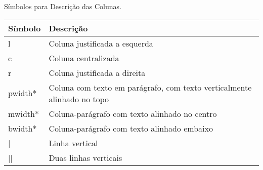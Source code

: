 \begin{quadro}[H]
    \centering
    \caption{Símbolos para Descrição das Colunas.\label{qua:quadro-colunas}}
    \begin{tabular}{|p{4cm}|p{10cm}|}
        \hline
        \textbf{Símbolo} & \textbf{Descrição} \\
        \hline
        l & Coluna justificada a esquerda \\
        \hline
        c & Coluna centralizada \\
        \hline
        r & Coluna justificada a direita \\
        \hline
        p{width*} & Coluna com texto em parágrafo, com texto verticalmente alinhado no topo \\
        \hline
        m{width*} & Coluna-parágrafo com texto alinhado no centro \\
        \hline
        b{width*} & Coluna-parágrafo com texto alinhado embaixo \\
        \hline
        | & Linha vertical \\
        \hline
        || & Duas linhas verticais \\
        \hline
    \end{tabular}
\end{quadro}